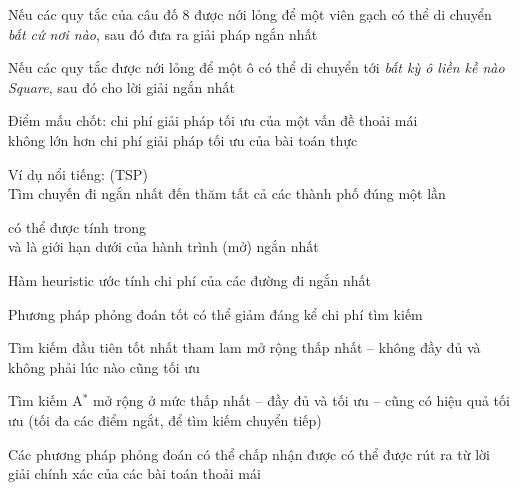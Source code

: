 \documentclass{article}
\def\Astar{A$^*$}
\begin{document}
\begin{huge}
Nếu các quy tắc của câu đố 8 được nới lỏng để một viên gạch có thể di chuyển
\emph{bất cứ nơi nào}, sau đó  đưa ra giải pháp ngắn nhất

Nếu các quy tắc được nới lỏng để một ô có thể di chuyển tới \emph{bất kỳ ô liền kề nào
Square}, sau đó  cho lời giải ngắn nhất

Điểm mấu chốt: chi phí giải pháp tối ưu của một vấn đề thoải mái \\
không lớn hơn chi phí giải pháp tối ưu của bài toán thực


Ví dụ nổi tiếng:  (TSP)\\
Tìm chuyến đi ngắn nhất đến thăm tất cả các thành phố đúng một lần

\vspace*{0.3in}

\textwidth
{}

 có thể được tính trong  \\
và là giới hạn dưới của hành trình (mở) ngắn nhất



Hàm heuristic ước tính chi phí của các đường đi ngắn nhất

Phương pháp phỏng đoán tốt có thể giảm đáng kể chi phí tìm kiếm 

Tìm kiếm đầu tiên tốt nhất tham lam mở rộng thấp nhất  \al
  -- không đầy đủ và không phải lúc nào cũng tối ưu

Tìm kiếm {\Astar} mở rộng ở mức thấp nhất \al
  -- đầy đủ và tối ưu\al
  -- cũng có hiệu quả tối ưu (tối đa các điểm ngắt, để tìm kiếm chuyển tiếp)

Các phương pháp phỏng đoán có thể chấp nhận được có thể được rút ra từ lời giải chính xác của các bài toán thoải mái

\end{huge}
\end{document}
